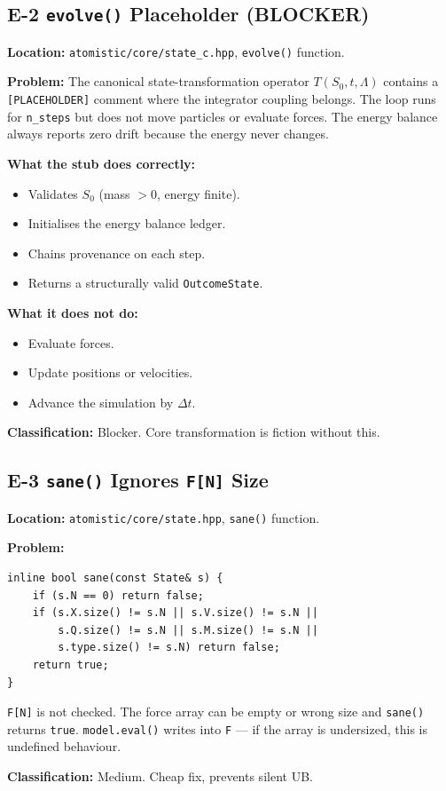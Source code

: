 \documentclass[11pt,a4paper]{article}
\begin{document}
\subsection{E-2 \textemdash{} \texttt{evolve()} Placeholder (BLOCKER)}
\begin{mdframed}[backgroundcolor=red!8]
\textbf{Location:} \texttt{atomistic/core/state\_c.hpp}, \texttt{evolve()} function.

\textbf{Problem:} The canonical state-transformation operator $T(S_0, t, \Lambda)$
contains a \texttt{[PLACEHOLDER]} comment where the integrator coupling belongs.
The loop runs for \texttt{n\_steps} but does not move particles or evaluate forces.
The energy balance always reports zero drift because the energy never changes.

\textbf{What the stub does correctly:}
\begin{itemize}
  \item Validates $S_0$ (mass $> 0$, energy finite).
  \item Initialises the energy balance ledger.
  \item Chains provenance on each step.
  \item Returns a structurally valid \texttt{OutcomeState}.
\end{itemize}

\textbf{What it does not do:}
\begin{itemize}
  \item Evaluate forces.
  \item Update positions or velocities.
  \item Advance the simulation by $\Delta t$.
\end{itemize}

\textbf{Classification:} Blocker. Core transformation is fiction without this.
\end{mdframed}

\subsection{E-3 \textemdash{} \texttt{sane()} Ignores \texttt{F[N]} Size}
\begin{mdframed}[backgroundcolor=amber!8]
\textbf{Location:} \texttt{atomistic/core/state.hpp}, \texttt{sane()} function.

\textbf{Problem:}
\begin{lstlisting}
inline bool sane(const State& s) {
    if (s.N == 0) return false;
    if (s.X.size() != s.N || s.V.size() != s.N ||
        s.Q.size() != s.N || s.M.size() != s.N ||
        s.type.size() != s.N) return false;
    return true;
}
\end{lstlisting}
\texttt{F[N]} is not checked. The force array can be empty or wrong size
and \texttt{sane()} returns \texttt{true}. \texttt{model.eval()} writes into
\texttt{F} --- if the array is undersized, this is undefined behaviour.

\textbf{Classification:} Medium. Cheap fix, prevents silent UB.
\end{mdframed}
\end{document}
